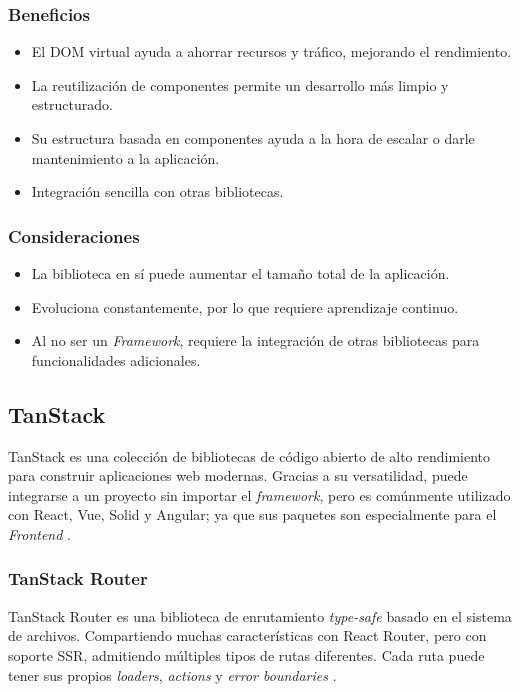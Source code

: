 \subsubsection{Beneficios}
\begin{itemize}
    \item El DOM virtual ayuda a ahorrar recursos y tráfico, mejorando el rendimiento.
    \item La reutilización de componentes permite un desarrollo más limpio y estructurado.
    \item Su estructura basada en componentes ayuda a la hora de escalar o darle mantenimiento a la aplicación.
    \item Integración sencilla con otras bibliotecas.
\end{itemize}

\subsubsection{Consideraciones}
\begin{itemize}
    \item La biblioteca en sí puede aumentar el tamaño total de la aplicación.
    \item Evoluciona constantemente, por lo que requiere aprendizaje continuo.
    \item Al no ser un \textit{Framework}, requiere la integración de otras bibliotecas para funcionalidades adicionales.
\end{itemize}

\subsection{TanStack}
TanStack es una colección de bibliotecas de código abierto de alto rendimiento para construir aplicaciones web modernas.
Gracias a su versatilidad, puede integrarse a un proyecto sin importar el \textit{framework}, pero es comúnmente utilizado
con React, Vue, Solid y Angular; ya que sus paquetes son especialmente para el \textit{Frontend} \cite{rauhala2025comparison}.

\subsubsection{TanStack Router}
TanStack Router es una biblioteca de enrutamiento \textit{type-safe} basado en el sistema de archivos. Compartiendo muchas 
características con React Router, pero con soporte SSR, admitiendo múltiples tipos de rutas diferentes. Cada ruta puede 
tener sus propios \textit{loaders}, \textit{actions} y \textit{error boundaries} \cite{rauhala2025comparison}.

